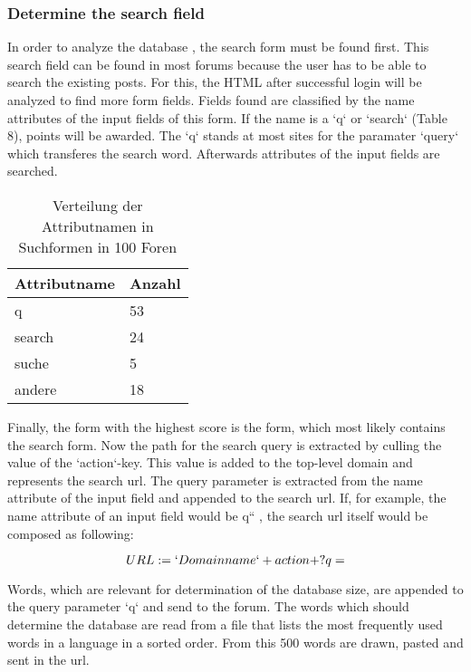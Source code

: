 \subsubsection {Determine the search field}
In order to analyze the database , the search form must be found first. This search field can be found in most forums because the user has to be able to search the existing posts. For this, the HTML after successful login will be analyzed to find more form fields. Fields found are classified by the name attributes of the input fields of this form. If the name is a `q` or `search` (Table 8), points will be awarded. The `q` stands at most sites for the paramater `query` which transferes the search word. Afterwards attributes of the input fields are searched.

\begin{table}[h!]
\centering 
\begin{tabular}{ | p{3cm} | p{3cm}|} \hline
\textbf{Attributname} & \textbf{Anzahl} \\ \hline
q & 53 \\ \hline
search & 24 \\ \hline
suche & 5 \\ \hline
andere & 18 \\ \hline
\end{tabular}
\caption{Verteilung der Attributnamen in Suchformen in 100 Foren}
\end{table}

Finally, the form with the highest score is the form, which most likely contains the search form. Now the path for the search query is extracted by culling the value of the `action`-key. This value is added to the top-level domain and represents the search url.
The query parameter is extracted from the name attribute of the input field and appended to the search url. If, for example, the name attribute of an input field would be q`` , the search url itself would be composed as following:

\[ URL := `Domainname` + action + ?q= \]

Words, which are relevant for determination of the database size, are appended to the query parameter `q` and send to the forum. The words which should determine the database are read from a file that lists the most frequently used words in a language in a sorted order. From this 500 words are drawn, pasted and sent in the url.

